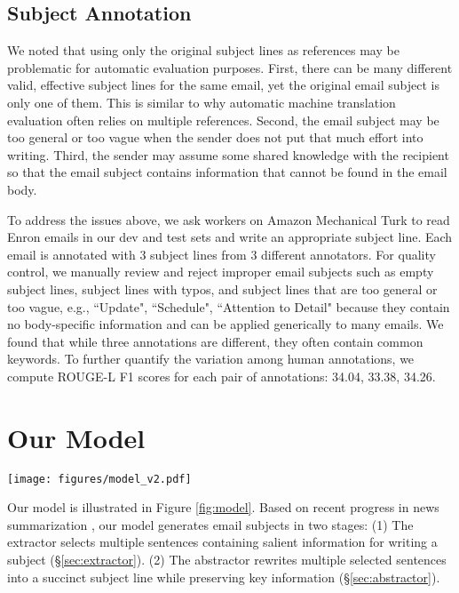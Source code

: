 \documentclass[11pt,a4paper]{article}
\begin{document}
\subsection{Subject Annotation}
We noted that using only the original subject lines as references may be problematic for automatic evaluation purposes.
First, there can be many different valid, effective subject lines for the same email, yet the original email subject is only one of them. This is similar to why automatic machine translation evaluation often relies on multiple references.
Second, the email subject may be too general or too vague when the sender does not put that much effort into writing.
Third, the sender may assume some shared knowledge with the recipient so that the email subject contains information that cannot be found in the email body.

To address the issues above, we ask workers on Amazon Mechanical Turk to read Enron emails in our dev and test sets and write an appropriate subject line.
Each email is annotated with 3 subject lines from 3 different annotators.
For quality control, we manually review and reject improper email subjects such as empty subject lines, subject lines with typos, and subject lines that are too general or too vague, e.g., ``Update", ``Schedule", ``Attention to Detail" because they contain no body-specific information and can be applied generically to many emails.  
We found that while three annotations are different, they often contain common keywords.
To further quantify the variation among human annotations, we compute ROUGE-L F1 scores for each pair of annotations: 34.04, 33.38, 34.26.

\section{Our Model}
\begin{figure*}[t]
  \centering
  \texttt{[image: figures/model\_v2.pdf]}
  \caption{Our model architecture. In this example, the input email body consists of four sentences from which the extractor selects the second and the third. The abstractor generates an email subject from the selected sentences. The quality estimator provides rewards by scoring the subject against the email body.}
  \vspace{-4mm}
  \label{fig:model}
\end{figure*}

Our model is illustrated in Figure \ref{fig:model}.
Based on recent progress in news summarization \cite{chen2018fast}, our model generates email subjects in two stages:
(1) The extractor selects multiple sentences containing salient information for writing a subject (\S\ref{sec:extractor}).
(2) The abstractor rewrites multiple selected sentences into a succinct subject line while preserving key information (\S\ref{sec:abstractor}).
\end{document}

